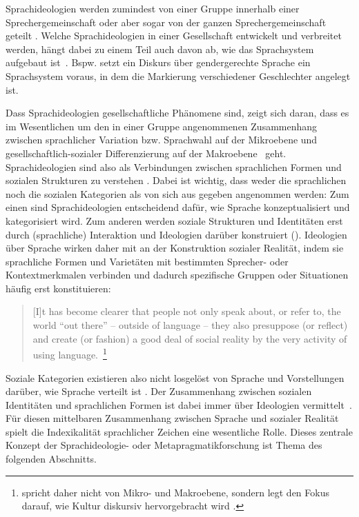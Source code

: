 \begin{sloppypar}
Sprachideologien werden zumindest von einer Gruppe innerhalb einer Sprechergemeinschaft oder aber sogar von der ganzen Sprechergemeinschaft geteilt \citep[s.][125]{Silverstein1998}. 
Welche Sprachideologien in einer Gesellschaft entwickelt und verbreitet werden, h{\"a}ngt dabei zu einem Teil auch davon ab, wie das Sprachsystem aufgebaut ist~\citep[s.][194]{Silverstein1979}. 
Bspw. setzt ein Diskurs über gendergerechte Sprache ein Sprachsystem voraus, in dem die Markierung verschiedener Geschlechter angelegt ist. 
\end{sloppypar}

\begin{sloppypar}
Dass Sprachideologien gesellschaftliche Phänomene sind, zeigt sich daran, dass es im Wesentlichen um den in einer Gruppe angenommenen \glqq Zusammenhang zwischen sprachlicher Variation bzw. Sprachwahl auf der Mikroebene und gesellschaftlich\hyp sozialer Differenzierung auf der Makroebene\grqq{}~\citep[202]{Konig2015} geht. 
Sprachideologien sind also als Verbindungen zwischen sprachlichen Formen und sozialen Strukturen zu verstehen \citep[s.][55]{Woolard1994}. 
Dabei ist wichtig, dass weder die sprachlichen noch die sozialen Kategorien als von sich aus gegeben angenommen werden:
Zum einen sind Sprachideologien entscheidend dafür, wie Sprache konzeptualisiert und kategorisiert wird. 
Zum anderen werden soziale Strukturen und Identit{\"a}ten erst durch (sprachliche) Interaktion und Ideologien darüber konstruiert (\cites[s.][289]{Ochs.1993}[407]{Ochs1996}[70]{Eckert.2016}). 
Ideologien über Sprache wirken daher mit an der Konstruktion sozialer Realität, indem sie sprachliche Formen und Varietäten mit bestimmten Sprecher- oder Kontextmerkmalen verbinden und dadurch spezifische Gruppen oder Situationen häufig erst konstituieren: 
\end{sloppypar}

\begin{quote}[I]t has become clearer that people not only speak about, or refer to, the world “out there” -- outside of language -- they also presuppose (or reflect) and create (or fashion) a good deal of social reality by the very activity of using language.~\citep[194]{Silverstein1979}\footnote{\citeauthor{Silverstein1979} spricht daher nicht von Mikro- und Makroebene, sondern legt den Fokus darauf, wie Kultur diskursiv hervorgebracht wird \citep[s. etwa][]{Silverstein.2013}.}\end{quote}
Soziale Kategorien existieren also nicht losgelöst von Sprache und Vorstellungen darüber, wie Sprache verteilt ist \citep[s.][81--82]{Cameron.1990}. 
Der Zusammenhang zwischen sozialen Identit{\"a}ten und sprachlichen Formen ist dabei immer über Ideologien vermittelt~\citep[s.][288]{Ochs.1993}. 
Für diesen mittelbaren Zusammenhang zwischen Sprache und sozialer Realität spielt die Indexikalität sprachlicher Zeichen eine wesentliche Rolle. Dieses zentrale Konzept der Sprachideologie- oder Metapragmatikforschung ist Thema des folgenden Abschnitts. 

